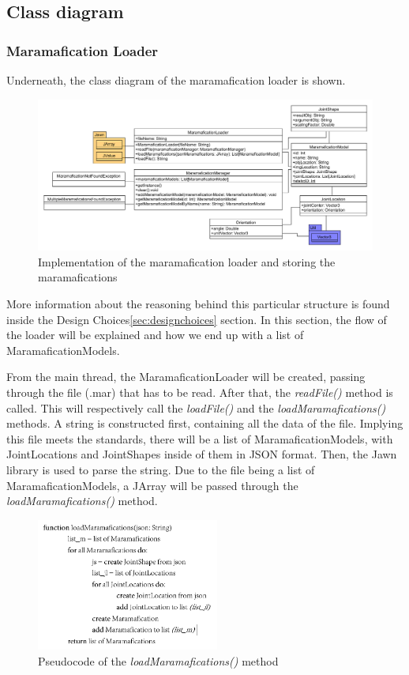 \documentclass[10pt]{extarticle} %
\begin{document}
    \subsection[class_diagram]{Class diagram}


    \subsubsection{Maramafication Loader}
    Underneath, the class diagram of the maramafication loader is shown.

    \begin{figure}[htb]
        \centering
        \includegraphics[width=\textwidth, height=\textheight, keepaspectratio]{Marama-Editor}
        \caption{Implementation of the maramafication loader and storing the maramafications}
    \end{figure}
    More information about the reasoning behind this particular structure is found inside the Design Choices\ref{sec:designchoices} section.
    In this section, the flow of the loader will be explained and how we end up with a list of MaramaficationModels.

    From the main thread, the MaramaficationLoader will be created, passing through the file (.mar) that has to be read.
    After that, the \textit{readFile()} method is called.
    This will respectively call the \textit{loadFile()} and the \textit{loadMaramafications()} methods.
    A string is constructed first, containing all the data of the file.
    Implying this file meets the standards, there will be a list of MaramaficationModels, with JointLocations and JointShapes inside of them in JSON format.
    Then, the Jawn library is used to parse the string. Due to the file being a list of MaramaficationModels, a JArray will be passed through the \textit{loadMaramafications()} method.
    \newpage
    \begin{figure}[htb]
        \center
        \includegraphics[width=60mm, keepaspectratio]{pseudocode}
        \caption{Pseudocode of the \textit{loadMaramafications()} method}
    \end{figure}
\end{document}
